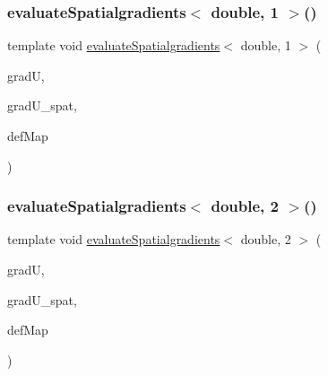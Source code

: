 \mbox{\label{function_evaluations_8cc_a688e887a593bf0c3effebec8495fb849}} 
\subsubsection{\texorpdfstring{evaluate\+Spatialgradients$<$ double, 1 $>$()}{evaluateSpatialgradients< double, 1 >()}\hspace{0.1cm}{\footnotesize\ttfamily [2/2]}}
{\footnotesize\ttfamily template void \mbox{\hyperlink{group___evaluation_functions_ga0b976342d491f6215953e2e65ea6a0de}{evaluate\+Spatialgradients}}$<$ double, 1 $>$ (\begin{DoxyParamCaption}\item[{Table$<$ 3, double $>$ \&}]{gradU,  }\item[{Table$<$ 3, double $>$}]{grad\+U\+\_\+spat,  }\item[{\mbox{\hyperlink{structdeformation_map}{deformation\+Map}}$<$ double, 1 $>$ \&}]{def\+Map }\end{DoxyParamCaption})}

\mbox{\label{function_evaluations_8cc_a8f2e81f6aec814594a6ce54d2a8634f4}} 
\subsubsection{\texorpdfstring{evaluate\+Spatialgradients$<$ double, 2 $>$()}{evaluateSpatialgradients< double, 2 >()}\hspace{0.1cm}{\footnotesize\ttfamily [1/2]}}
{\footnotesize\ttfamily template void \mbox{\hyperlink{group___evaluation_functions_ga0b976342d491f6215953e2e65ea6a0de}{evaluate\+Spatialgradients}}$<$ double, 2 $>$ (\begin{DoxyParamCaption}\item[{Table$<$ 2, double $>$ \&}]{gradU,  }\item[{Table$<$ 2, double $>$}]{grad\+U\+\_\+spat,  }\item[{\mbox{\hyperlink{structdeformation_map}{deformation\+Map}}$<$ double, 2 $>$ \&}]{def\+Map }\end{DoxyParamCaption})}

